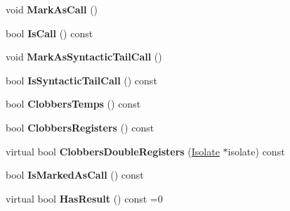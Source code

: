 \begin{DoxyCompactItemize}
\item 
void {\bfseries Mark\+As\+Call} ()\hypertarget{classv8_1_1internal_1_1_l_instruction_a9dc545055b25ef6d6210176159e4110a}{}\label{classv8_1_1internal_1_1_l_instruction_a9dc545055b25ef6d6210176159e4110a}

\item 
bool {\bfseries Is\+Call} () const \hypertarget{classv8_1_1internal_1_1_l_instruction_a00e004b64fc7724c83aad55ac9530e0f}{}\label{classv8_1_1internal_1_1_l_instruction_a00e004b64fc7724c83aad55ac9530e0f}

\item 
void {\bfseries Mark\+As\+Syntactic\+Tail\+Call} ()\hypertarget{classv8_1_1internal_1_1_l_instruction_a72c62906028bed230decd2719d08a847}{}\label{classv8_1_1internal_1_1_l_instruction_a72c62906028bed230decd2719d08a847}

\item 
bool {\bfseries Is\+Syntactic\+Tail\+Call} () const \hypertarget{classv8_1_1internal_1_1_l_instruction_a2f5419706e2dbe5ab9cc774e3c2816c0}{}\label{classv8_1_1internal_1_1_l_instruction_a2f5419706e2dbe5ab9cc774e3c2816c0}

\item 
bool {\bfseries Clobbers\+Temps} () const \hypertarget{classv8_1_1internal_1_1_l_instruction_ae0d7f1fe3d3d67357050ddb2cd539d62}{}\label{classv8_1_1internal_1_1_l_instruction_ae0d7f1fe3d3d67357050ddb2cd539d62}

\item 
bool {\bfseries Clobbers\+Registers} () const \hypertarget{classv8_1_1internal_1_1_l_instruction_a1be40eb2a9feb7da6047a05f41e6fb5c}{}\label{classv8_1_1internal_1_1_l_instruction_a1be40eb2a9feb7da6047a05f41e6fb5c}

\item 
virtual bool {\bfseries Clobbers\+Double\+Registers} (\hyperlink{classv8_1_1internal_1_1_isolate}{Isolate} $\ast$isolate) const \hypertarget{classv8_1_1internal_1_1_l_instruction_acbdd958e836acbc67e53ae3de2b17149}{}\label{classv8_1_1internal_1_1_l_instruction_acbdd958e836acbc67e53ae3de2b17149}

\item 
bool {\bfseries Is\+Marked\+As\+Call} () const \hypertarget{classv8_1_1internal_1_1_l_instruction_afb5aff9204835a6dcec75538e3da4b2f}{}\label{classv8_1_1internal_1_1_l_instruction_afb5aff9204835a6dcec75538e3da4b2f}

\item 
virtual bool {\bfseries Has\+Result} () const  =0\hypertarget{classv8_1_1internal_1_1_l_instruction_af38ca7b40171f2ed75a2970ac7e15fd8}{}\label{classv8_1_1internal_1_1_l_instruction_af38ca7b40171f2ed75a2970ac7e15fd8}


\end{DoxyCompactItemize}
